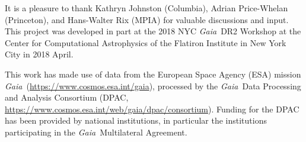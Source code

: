 \documentclass[12pt, modern]{aastex62}
\newcommand{\acronym}[1]{{\small{#1}}}
\newcommand{\Gaia}{\textsl{Gaia}}
\begin{document}
\acknowledgements
It is a pleasure to thank
  Kathryn Johnston (Columbia),
  Adrian Price-Whelan (Princeton),
  and
  Hans-Walter Rix (\acronym{MPIA})
for valuable discussions and input.
This project was developed in part at the
2018 \acronym{NYC} \Gaia\ \acronym{DR2} Workshop
at the Center for Computational Astrophysics of the Flatiron Institute
in New York City in 2018 April.

This work has made use of data from the European Space Agency (\acronym{ESA}) mission
\Gaia\ (\url{https://www.cosmos.esa.int/gaia}), processed by the \Gaia\ Data
Processing and Analysis Consortium (\acronym{DPAC},
\url{https://www.cosmos.esa.int/web/gaia/dpac/consortium}). Funding for the
\acronym{DPAC}
has been provided by national institutions, in particular the institutions
participating in the \Gaia\ Multilateral Agreement.



\end{document}
